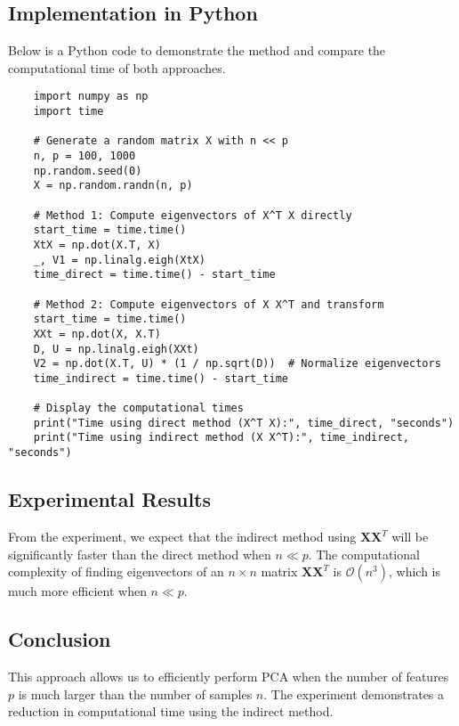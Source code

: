 \documentclass[11pt]{article}
\begin{document}
	\subsection*{Implementation in Python}
	Below is a Python code to demonstrate the method and compare the computational time of both approaches.
	
	\begin{verbatim}
	import numpy as np
	import time
	
	# Generate a random matrix X with n << p
	n, p = 100, 1000
	np.random.seed(0)
	X = np.random.randn(n, p)
	
	# Method 1: Compute eigenvectors of X^T X directly
	start_time = time.time()
	XtX = np.dot(X.T, X)
	_, V1 = np.linalg.eigh(XtX)
	time_direct = time.time() - start_time
	
	# Method 2: Compute eigenvectors of X X^T and transform
	start_time = time.time()
	XXt = np.dot(X, X.T)
	D, U = np.linalg.eigh(XXt)
	V2 = np.dot(X.T, U) * (1 / np.sqrt(D))  # Normalize eigenvectors
	time_indirect = time.time() - start_time
	
	# Display the computational times
	print("Time using direct method (X^T X):", time_direct, "seconds")
	print("Time using indirect method (X X^T):", time_indirect, "seconds")
	\end{verbatim}
	
	\subsection*{Experimental Results}
	From the experiment, we expect that the indirect method using $\mathbf{X} \mathbf{X}^T$ will be significantly faster than the direct method when $n \ll p$. The computational complexity of finding eigenvectors of an $n \times n$ matrix $\mathbf{X} \mathbf{X}^T$ is $\mathcal{O}(n^3)$, which is much more efficient when $n \ll p$.
	
	\subsection*{Conclusion}
	This approach allows us to efficiently perform PCA when the number of features $p$ is much larger than the number of samples $n$. The experiment demonstrates a reduction in computational time using the indirect method.	
	
	\newpage

	
\end{document}
